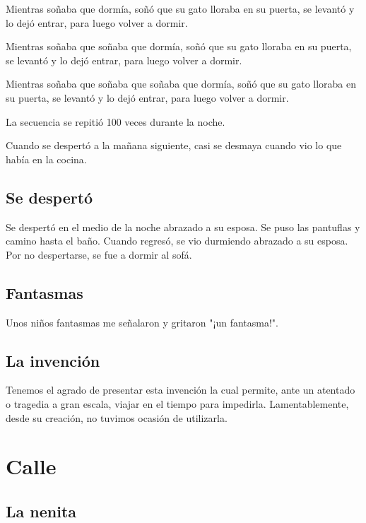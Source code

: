 \documentclass[11pt,twoside,openright,a6paper]{book}
\begin{document}
Mientras soñaba que dormía, soñó que su gato lloraba en su puerta, se levantó y lo dejó entrar, para luego volver a dormir.

Mientras soñaba que soñaba que dormía, soñó que su gato lloraba en su puerta, se levantó y lo dejó entrar, para luego volver a dormir.

Mientras soñaba que soñaba que soñaba que dormía, soñó que su gato lloraba en su puerta, se levantó y lo dejó entrar, para luego volver a dormir.

La secuencia se repitió 100 veces durante la noche.

Cuando se despertó a la mañana siguiente, casi se desmaya cuando vio lo que había en la cocina.

\chapter*{Se despertó}

Se despertó en el medio de la noche abrazado a su esposa. Se puso las pantuflas y camino hasta el baño. Cuando regresó, se vio durmiendo abrazado a su esposa. Por no despertarse, se fue a dormir al sofá.

\chapter*{Fantasmas}

Unos niños fantasmas me señalaron y gritaron "¡un fantasma!".

\chapter*{La invención}


Tenemos el agrado de presentar esta invención la cual permite, ante un atentado o tragedia a gran escala, viajar en el tiempo para impedirla. Lamentablemente, desde su creación, no tuvimos ocasión de utilizarla.

\part*{Calle}

\chapter*{La nenita}
\end{document}
